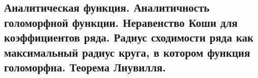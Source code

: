 \subsection{Аналитическая функция. Аналитичность голоморфной функции. Неравенство Коши для коэффициентов ряда. Радиус сходимости ряда как максимальный радиус круга, в котором функция голоморфна. Теорема Лиувилля.}